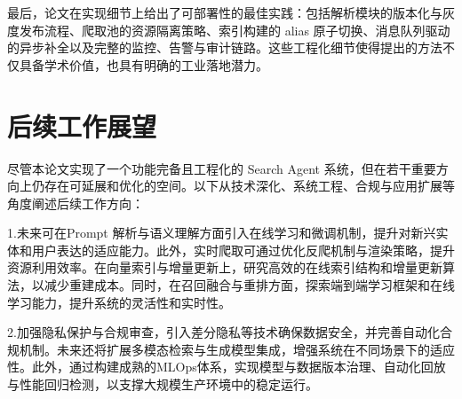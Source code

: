 最后，论文在实现细节上给出了可部署性的最佳实践：包括解析模块的版本化与灰度发布流程、爬取池的资源隔离策略、索引构建的 alias 原子切换、消息队列驱动的异步补全以及完整的监控、告警与审计链路。这些工程化细节使得提出的方法不仅具备学术价值，也具有明确的工业落地潜力。
\section{后续工作展望}
尽管本论文实现了一个功能完备且工程化的 Search Agent 系统，但在若干重要方向上仍存在可延展和优化的空间。以下从技术深化、系统工程、合规与应用扩展等角度阐述后续工作方向：

1.未来可在Prompt 解析与语义理解方面引入在线学习和微调机制，提升对新兴实体和用户表达的适应能力。此外，实时爬取可通过优化反爬机制与渲染策略，提升资源利用效率。在向量索引与增量更新上，研究高效的在线索引结构和增量更新算法，以减少重建成本。同时，在召回融合与重排方面，探索端到端学习框架和在线学习能力，提升系统的灵活性和实时性。

2.加强隐私保护与合规审查，引入差分隐私等技术确保数据安全，并完善自动化合规机制。未来还将扩展多模态检索与生成模型集成，增强系统在不同场景下的适应性。此外，通过构建成熟的MLOps体系，实现模型与数据版本治理、自动化回放与性能回归检测，以支撑大规模生产环境中的稳定运行。